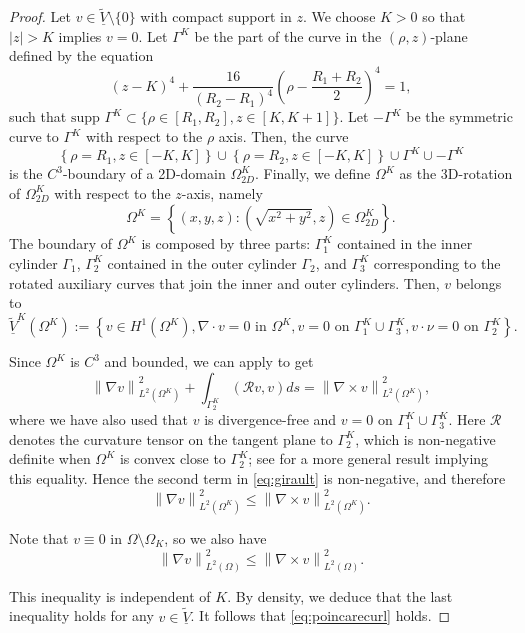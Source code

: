 \documentclass[a4paper,11pt]{amsart}
\numberwithin{equation}{section}
\numberwithin{figure}{section}
\newcommand{\norm}[1]{\left \lVert #1 \right \rVert}
\begin{document}
\begin{proof}
	Let $v\in \underline{\widetilde{V}}\setminus \{0\}$ with compact support in $z$. We choose $K>0$ so that $|z|>K$ implies $v=0.$
	Let $\Gamma^K$ be the part of the curve in the $(\rho,z)$-plane defined by the equation
	$$(z-K)^4+\frac{16}{(R_2-R_1)^4}\left(\rho-\frac{R_1+R_2}{2}\right)^4=1,$$ such that $\text{supp } \Gamma^K\subset \{\rho\in [R_1,R_2],z\in [K,K+1]\}$. Let $-\Gamma^K$ be the symmetric curve to $\Gamma^K$ with respect to the $\rho$ axis. Then, the curve $$\left\{\rho=R_1,z\in[-K,K]\right\}\cup\left\{\rho=R_2,z\in[-K,K]\right\}\cup \Gamma^K\cup -\Gamma^K $$ is the $C^3$-boundary of a 2D-domain $\Omega_{2D}^{K}$. Finally, we define $\Omega^K$ as the 3D-rotation of  $\Omega^K_{2D}$ with respect to the $z$-axis, namely
	\begin{equation}\label{eq:Omega^K}
		\Omega^K=\left\{(x,y,z):(\sqrt{x^2+y^2},z)\in \Omega^K_{2D}\right\}.
	\end{equation}
	The boundary of $\Omega^K$ is composed by three parts: $\Gamma_1^K$ contained in the inner cylinder $\Gamma_1$, $\Gamma_2^K$ contained in the outer cylinder $\Gamma_2$, and $\Gamma_3^K$ corresponding to the rotated auxiliary curves that join the inner and outer cylinders.
	Then, $v$ belongs to
	$$\underline{\widetilde V}^K(\Omega^K):= \left\{v\in H^1(\Omega^K), \nabla\cdot v=0 \text{ in } \Omega^K,  v=0 \text{ on } \Gamma_1^K\cup \Gamma_3^K, v\cdot \nu=0  \text{ on } \Gamma_2^K\right\}.$$
	
	Since $\Omega^K$ is $C^3$ and bounded, we can apply \cite[Lemma I.3.8]{girault1986finite} to get
	\begin{equation}\label{eq:girault}
		\norm{\nabla v}^2_{L^2(\Omega^K)}+\int_{\Gamma^K_2} (\mathcal{R}v,v)ds=\norm{\nabla\times v}^2_{L^2(\Omega^K)},
	\end{equation}
	where we have also used that $v$ is divergence-free and $v=0$ on $\Gamma_1^K \cup \Gamma_3^K$. Here $\mathcal{R}$ denotes the curvature tensor on the tangent plane to $\Gamma_2^K$, which is non-negative definite when $\Omega^K$ is convex close to $\Gamma_2^K$; see \cite[Theorem 3.1.1.1]{grisvard1985elliptic} for a more general result implying this equality. Hence the second term in \eqref{eq:girault} is non-negative, and therefore
	$$\norm{\nabla v}^2_{L^2(\Omega^K)}\leq \norm{\nabla\times v}^2_{L^2(\Omega^K)}.    $$
	
	Note that $v\equiv 0$ in $\Omega\setminus \Omega_K$, so we also have
	$$\norm{\nabla v}^2_{L^2(\Omega)}\leq\norm{\nabla\times v}^2_{L^2(\Omega)}.$$
	
	This inequality is independent of $K$. By density, we deduce that the last inequality holds for any $v\in \widetilde{\underline{V}}$. It follows that \eqref{eq:poincarecurl} holds.
\end{proof}
\end{document}
